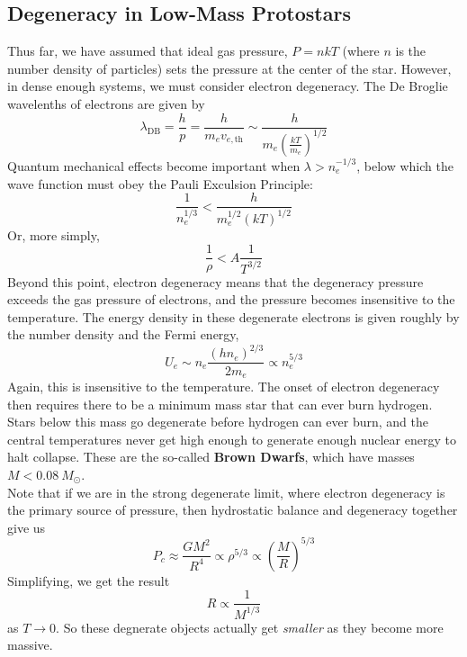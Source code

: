 \documentclass[10pt]{article}
\numberwithin{equation}{section}
\newcommand{\n}{\noindent}
\begin{document}
  \subsection{Degeneracy in Low-Mass Protostars} %
  \label{sub:degeneracy_in_low_mass_protostars}
  Thus far, we have assumed that ideal gas pressure, $P = nkT$ (where $n$ is
  the number density of particles) sets the pressure at the center of the star.
  However, in dense enough systems, we must consider electron degeneracy. The
  De Broglie wavelenths of electrons are given by
	\begin{equation}
		\label{eq:debroglie:1} \lambda_{\mathrm{DB}} = \frac{h}{p} = 
		\frac{h}{m_ev_{e,\mathrm{th}}} \sim
		\frac{h}{m_e\left(\frac{kT}{m_e}\right)^{1/2}}
	\end{equation}
	Quantum mechanical effects become important when $\lambda > n_e^{-1/3}$,
below which the wave function must obey the Pauli Exculsion Principle:
	\begin{equation}
		\label{eq:debroglie:2} \frac{1}{n_e^{1/3}} < \frac{h}{m_e^{1/2}(kT)^{1/2}}
	\end{equation}
	Or, more simply,
	\begin{equation}
		\label{eq:debroglie:3} \frac{1}{\rho} < A\frac{1}{T^{3/2}}
	\end{equation}
	Beyond this point, electron degeneracy means that the degeneracy pressure
exceeds the gas pressure of electrons, and the pressure becomes insensitive to
the temperature. The energy density in these degenerate electrons is given
roughly by the number density and the Fermi energy,
	\begin{equation}
		\label{eq:debroglie:4} U_e \sim n_e \frac{\left(h n_e\right)^{2/3}}{2 m_e}
		\propto n_e^{5/3}
	\end{equation}
	Again, this is insensitive to the temperature. The onset of electron
degeneracy then requires there to be a minimum mass star that can ever burn
hydrogen. Stars below this mass go degenerate before hydrogen can ever burn,
and the central temperatures never get high enough to generate enough nuclear
energy to halt collapse. These are the so-called \textbf{Brown Dwarfs}, which
have masses $M < 0.08\ M_\odot$.\\

	\n Note that if we are in the strong degenerate limit, where electron
degeneracy is the primary source of pressure, then hydrostatic balance and
degeneracy together give us
	\begin{equation}
		\label{eq:debroglie:4} P_c \approx \frac{GM^2}{R^4} \propto \rho^{5/3}
		\propto \left(\frac{M}{R}\right)^{5/3}
	\end{equation}
	Simplifying, we get the result
	\begin{equation}
		\label{eq:debroglie:5} \boxed{R\propto \frac{1}{M^{1/3}}}
	\end{equation}
	as $T\to 0$. So these degnerate objects actually get \emph{smaller} as they become more massive.
\end{document}
